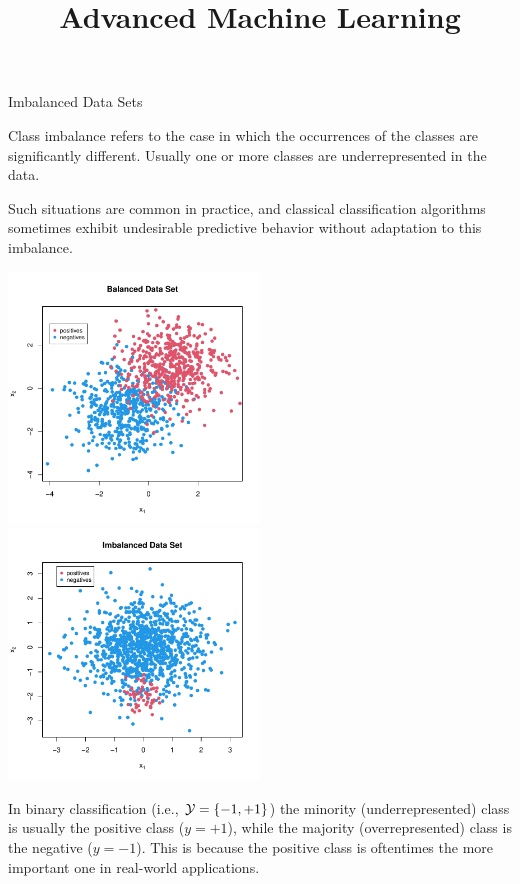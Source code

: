 \documentclass[11pt,compress,t,notes=noshow, xcolor=table]{beamer}
\title{Advanced Machine Learning}
\date{}
\begin{document}



\sloppy

\begin{vbframe}{Imbalanced Data Sets}
%
\small{
  \begin{itemize}
%  	
	\begin{minipage}{0.45\textwidth}
%		    
		    \item Class imbalance refers to the case in which the occurrences of the classes are significantly different. Usually one or more classes are underrepresented in the data.
%		     
		    \item Such situations are common in practice, and classical classification algorithms sometimes exhibit undesirable predictive behavior without adaptation to this imbalance.
	\end{minipage}
	\begin{minipage}{0.45\textwidth}    
		\begin{center}
			\includegraphics[width=0.5\textwidth]{figure_man/balanced_data_plot}
			\includegraphics[width=0.5\textwidth]{figure_man/imbalanced_data_plot}
		\end{center}
	\end{minipage}

%	
	\item In binary classification (i.e., $\mathcal{Y} =\{-1,+1\}$) the minority (underrepresented) class is usually the positive class ($y=+1$), while the majority (overrepresented) class is the negative ($y=-1$). This is because the positive class is oftentimes the more important one in real-world applications.
%

  \end{itemize}}
%
\end{vbframe}
\end{document}
